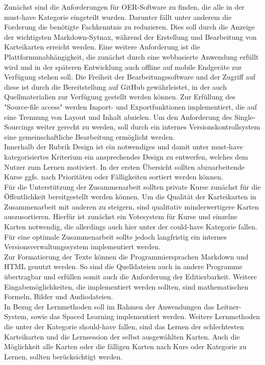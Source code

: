 Zunächst sind die Anforderungen für OER-Software zu finden, die alle in der must-have Kategorie eingeteilt wurden. Darunter fällt unter anderem die Forderung die benötigte Fachkenntnis zu reduzieren. Dies soll durch die Anzeige der wichtigsten Markdown-Sytnax, während der Erstellung und Bearbeitung von Karteikarten erreicht werden. Eine weitere Anforderung ist die Plattformunabhängigkeit, die zunächst durch eine webbasierte Anwendung erfüllt wird und in der späteren Entwicklung auch offline auf mobile Endgeräte zur Verfügung stehen soll. Die Freiheit der Bearbeitungssoftware und der Zugriff auf diese ist durch die Bereitstellung auf GitHub gewährleistet, in der auch Quellmaterialien zur Verfügung gestellt werden können. Zur Erfüllung des "Source-file access" werden Import- und Exportfunktionen implementiert, die auf eine Trennung von Layout und Inhalt abzielen. Um den Anforderung des Single-Sourcings weiter gerecht zu werden, soll durch ein internes Versionskontrollsystem eine gemeinschaftliche Bearbeitung ermöglicht werden.\\

Innerhalb der Rubrik Design ist ein notwendiges und damit unter must-have kategorisiertes Kriterium ein ansprechendes Design zu entwerfen, welches dem Nutzer zum Lernen motiviert. 
In der ersten Übersicht sollten abzuarbeitende Kurse ggfs. nach Prioritäten oder Fälligkeiten sortiert werden können. \\

Für die Unterstützung der Zusammenarbeit sollten private Kurse zunächst für die Öffentlichkeit bereitgestellt werden können. Um die Qualität der Karteikarten in Zusammenarbeit mit anderen zu steigern, sind qualitativ minderwertigere Karten auszusortieren. Hierfür ist zunächst ein Votesystem für Kurse und einzelne Karten notwendig, die allerdings auch hier unter der could-have Kategorie fallen. Für eine optimale Zusammenarbeit sollte jedoch langfristig ein internes Versionsverwaltungssystem implementiert werden.\\

Zur Formatierung der Texte können die Programmiersprachen Markdown und HTML genutzt werden. So sind die Quelldateien auch in andere Programme übertragbar und erfüllen somit auch die Anforderung der Editierbarkeit. Weitere Eingabemöglichkeiten, die implementiert werden sollten, sind mathematischen Formeln, Bilder und Audiodateien. \\

In Bezug der Lernmethoden soll im Rahmen der Anwendungen das Leitner-System, sowie das Spaced Learning implementiert werden. Weitere Lernmethoden die unter der Kategorie should-have fallen, sind das Lernen der schlechtesten Karteikarten und die Lernsession der selbst ausgewählten Karten. Auch die Möglichkeit alle Karten oder die fälligen Karten nach Kurs oder Kategorie zu Lernen, sollten berücksichtigt werden. \\

